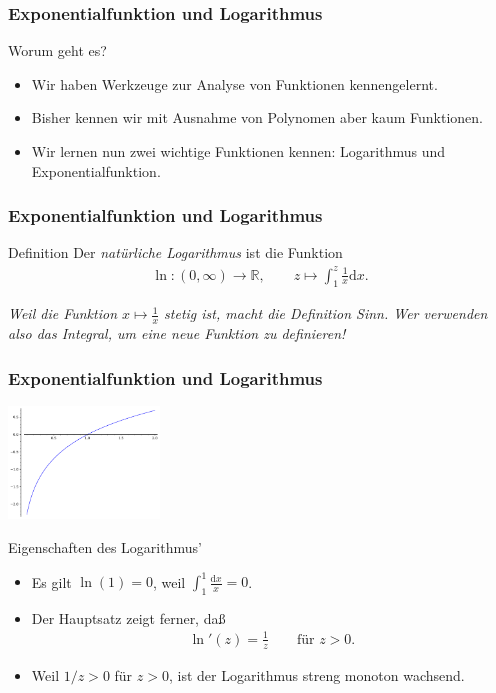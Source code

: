 \documentclass{beamer}
\title[Annuma]{\mytitle}
\author[Amin Coja-Oghlan]{Amin Coja-Oghlan}
\institute[Frankfurt]{JWGUFFM}
\date{}
\renewcommand{\emph}[1]{{\textcolor{solarizedRed}{\itshape #1}}}
\newcommand\dd{\mathrm d}
\newcommand\RR{\mathbb R}
\newcommand{\ue}{\"u}
\newcommand{\mytitle}{Exponentialfunktion und Logarithmus}
\begin{document}
\frame[plain]{\titlepage}

\begin{frame}\frametitle{\mytitle}
	\begin{block}{Worum geht es?}
		\begin{itemize}
			\item Wir haben Werkzeuge zur Analyse von Funktionen kennengelernt.
			\item Bisher kennen wir mit Ausnahme von Polynomen aber kaum Funktionen.
			\item Wir lernen nun zwei wichtige Funktionen kennen: Logarithmus und Exponentialfunktion.
		\end{itemize}
	\end{block}
\end{frame}

\begin{frame}\frametitle{\mytitle}
	\begin{block}{Definition}
			Der \emph{nat\ue rliche Logarithmus} ist die Funktion
				\begin{align*}
					\ln:(0,\infty)\to\RR,\qquad z\mapsto\int_1^z\frac{1}{x}\dd x.
				\end{align*}
	\end{block}
	{\itshape Weil die Funktion $x\mapsto\frac{1}{x}$ stetig ist, macht die Definition Sinn. Wer verwenden also das Integral, um eine neue Funktion zu definieren!}
\end{frame}

\begin{frame}\frametitle{\mytitle}
	\hfill\includegraphics[height=30mm]{pics/plot_ln.pdf}
	\begin{block}{Eigenschaften des Logarithmus'}
	\begin{itemize}
		\item Es gilt $\ln(1)=0$, weil $\int_1^1\frac{\dd x}{x}=0$.
		\item Der Hauptsatz zeigt ferner, da\ss
			\begin{align*}
				\ln'(z)=\frac{1}{z}\qquad\mbox{f\ue r }z>0.
			\end{align*}
		\item Weil $1/z>0$ f\ue r $z>0$, ist der Logarithmus streng monoton wachsend.
	\end{itemize}
	\end{block}
\end{frame}
\end{document}
